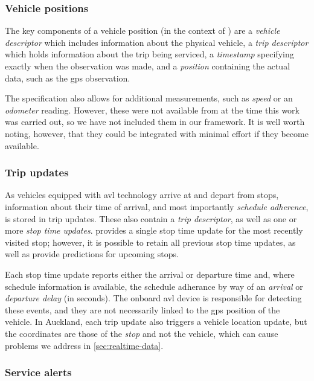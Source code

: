 \subsubsection{Vehicle positions}
\label{sec:gtfs_rt_vehicle}

The key components of a vehicle position (in the context of \GTFS{}) are a \emph{vehicle descriptor} which includes information about the physical vehicle, a \emph{trip descriptor} which holds information about the trip being serviced, a \emph{timestamp} specifying exactly when the observation was made, and a \emph{position} containing the actual data, such as the \gls{gps} observation.

The specification also allows for additional measurements, such as \emph{speed} or an \emph{odometer} reading. However, these were not available from \AT{} at the time this work was carried out, so we have not included them in our framework. It is well worth noting, however, that they could be integrated with minimal effort if they become available.


\subsubsection{Trip updates}
\label{sec:gtfs_rt_trip}

As vehicles equipped with \gls{avl} technology arrive at and depart from stops, information about their time of arrival, and most importantly \emph{schedule adherence}, is stored in trip updates. These also contain a \emph{trip descriptor}, as well as one or more \emph{stop time updates}. \AT{} provides a single stop time update for the most recently visited stop; however, it is possible to retain all previous stop time updates, as well as provide predictions for upcoming stops.


Each stop time update reports either the arrival or departure time and, where schedule information is available, the schedule adherance by way of an \emph{arrival} or \emph{departure delay} (in seconds). The onboard \gls{avl} device is responsible for detecting these events, and they are not necessarily linked to the \gls{gps} position of the vehicle. In Auckland, each trip update also triggers a vehicle location update, but the coordinates are those of the \emph{stop} and not the vehicle, which can cause problems we address in \cref{sec:realtime-data}.



\subsubsection{Service alerts}
\label{sec:gtfs_rt_alerts}

